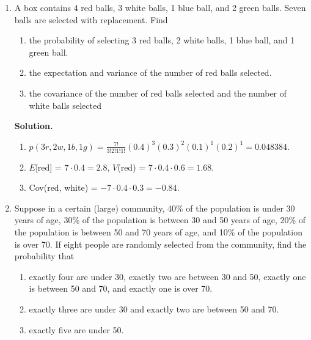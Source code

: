 \documentclass[9pt]{article}
\newcommand{\D}{\displaystyle}
\begin{document}
\begin{enumerate}
   \item A box contains 4 red balls, 3 white balls, 1 blue ball, and 2 green
         balls. Seven balls are selected with replacement. Find
         \begin{enumerate}
            \item the probability of selecting 3 red balls, 2 white balls, 1
                  blue ball, and 1 green ball.
            \item the expectation and variance of the number of red balls
                  selected.
            \item the covariance of the number of red balls selected and the
                  number of white balls selected
         \end{enumerate}
         
      \textbf{Solution.}
      
      \begin{enumerate}
         \item $p(3r, 2w, 1b, 1g) = \D\frac{7!}{3!2!1!1!}(0.4)^3(0.3)^2(0.1)^1
               (0.2)^1 = 0.048384$.
         \item $E$[red] = $7 \cdot 0.4 = 2.8$, $V$(red) =
               $7 \cdot 0.4 \cdot 0.6 = 1.68$.
         \item Cov(red, white) = $-7 \cdot 0.4 \cdot 0.3 = -0.84$.
      \end{enumerate}
   \item Suppose in a certain (large) community, 40\% of the population is under
         30 years of age, 30\% of the population is between 30 and 50 years of
         age, 20\% of the population is between 50 and 70 years of age, and 10\%
         of the population is over 70. If eight people are randomly selected
         from the community, find the probability that
         \begin{enumerate}
            \item exactly four are under 30, exactly two are between 30 and 50,
                  exactly one is between 50 and 70, and exactly one is over 70.
            \item exactly three are under 30 and exactly two are between 50 and
                  70.
            \item exactly five are under 50.
         \end{enumerate}
         

\end{enumerate}
\end{document}
